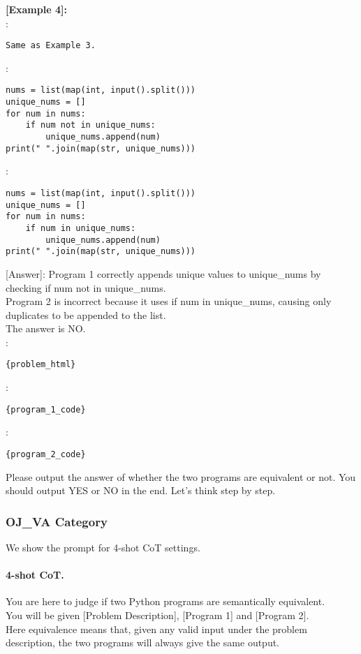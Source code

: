 \noindent\textbf{[Example 4]:}\\
:\\
\begin{lstlisting}
Same as Example 3.
\end{lstlisting}
\text{    [Program 1]}:\\
\begin{lstlisting}
nums = list(map(int, input().split()))
unique_nums = []
for num in nums:
    if num not in unique_nums:
        unique_nums.append(num)
print(" ".join(map(str, unique_nums)))
\end{lstlisting}
\text{    [Program 2]}:\\
\begin{lstlisting}
nums = list(map(int, input().split()))
unique_nums = []
for num in nums:
    if num in unique_nums:
        unique_nums.append(num)
print(" ".join(map(str, unique_nums)))
\end{lstlisting}
[Answer]: Program 1 correctly appends unique values to unique\_nums by checking if num not in unique\_nums.\\
Program 2 is incorrect because it uses if num in unique\_nums, causing only duplicates to be appended to the list.\\
The answer is NO.\\

:\\
\begin{lstlisting}
{problem_html}
\end{lstlisting}

\text{    [Program 1]}:\\
\begin{lstlisting}
{program_1_code}
\end{lstlisting}

\text{    [Program 2]}:\\
\begin{lstlisting}
{program_2_code}
\end{lstlisting}

Please output the answer of whether the two programs are equivalent or not. You should output YES or NO in the end. Let's think step by step.


\subsubsection{OJ\_VA Category}
We show the prompt for 4-shot CoT settings.

\paragraph{4-shot CoT.} You are here to judge if two Python programs are semantically equivalent.\\
You will be given [Problem Description], [Program 1] and [Program 2].\\
Here equivalence means that, given any valid input under the problem description, the two programs will always give the same output.\\

